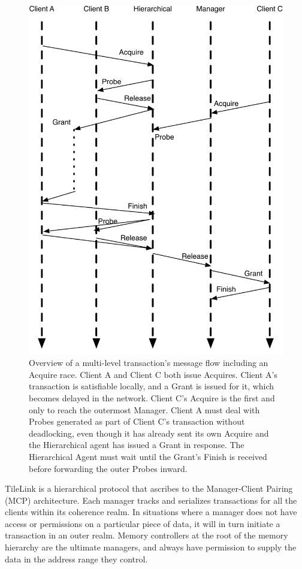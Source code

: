 \begin{figure}[!p]
\centering
\includegraphics[width=0.8\columnwidth]{tilelink/figures/acq-merge-5-2.pdf}
\caption{Overview of a multi-level transaction's message flow including an Acquire race.
Client A and Client C both issue Acquires.
Client A's transaction is satisfiable locally, and a Grant is issued for it, which becomes delayed in the network.
Client C's Acquire is the first and only to reach the outermost Manager.
Client A must deal with Probes generated as part of Client C's transaction without deadlocking, even though it has already sent its own Acquire
and the Hierarchical agent has issued a Grant in response.
The Hierarchical Agent must wait until the Grant's Finish is received before forwarding the outer Probes inward.
}
\label{fig:acq-merge-5-2}
\end{figure}

TileLink is a hierarchical protocol that ascribes to the Manager-Client Pairing (MCP) architecture.
Each manager tracks and serializes transactions for all the clients within its coherence realm.
In situations where a manager does not have access or permissions on a particular piece of data,
it will in turn initiate a transaction in an outer realm.
Memory controllers at the root of the memory hierarchy are the ultimate managers, and always have permission
to supply the data in the address range they control.

